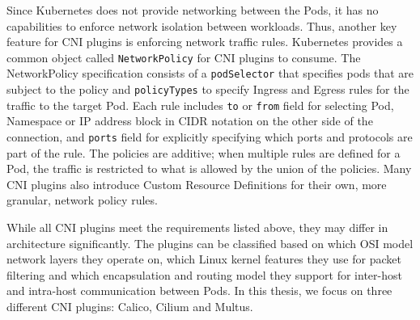 \documentclass[english, 12pt, a4paper, sci, utf8, a-2b, online]{aaltothesis}
\begin{document}

Since Kubernetes does not provide networking between the Pods, it has no capabilities to enforce network isolation between workloads. Thus, another key feature for CNI plugins is enforcing network traffic rules. Kubernetes provides a common object called \texttt{NetworkPolicy} for CNI plugins to consume. The NetworkPolicy specification consists of a \texttt{podSelector} that specifies pods that are subject to the policy and \texttt{policyTypes} to specify Ingress and Egress rules for the traffic \cite{budigiri2021network} to the target Pod. Each rule includes \texttt{to} or \texttt{from} field for selecting Pod, Namespace or IP address block in CIDR notation on the other side of the connection, and \texttt{ports} field for explicitly specifying which ports and protocols are part of the rule. The policies are additive; when multiple rules are defined for a Pod, the traffic is restricted to what is allowed by the union of the policies. Many CNI plugins also introduce Custom Resource Definitions for their own, more granular, network policy rules.

While all CNI plugins meet the requirements listed above, they may differ in architecture significantly. The plugins can be classified based on which OSI model network layers they operate on, which Linux kernel features they use for packet filtering and which encapsulation and routing model they support for inter-host and intra-host communication between Pods. In this thesis, we focus on three different CNI plugins: Calico, Cilium and Multus.
\end{document}
